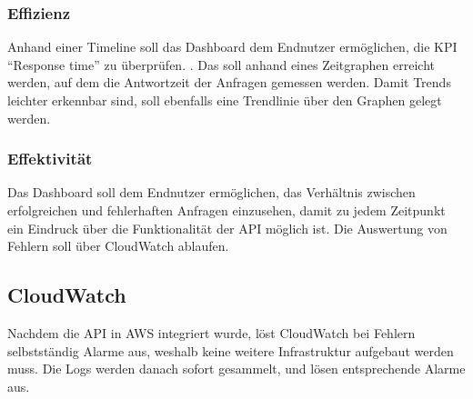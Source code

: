 \subsubsection{Effizienz}
Anhand einer Timeline soll das Dashboard dem Endnutzer ermöglichen, die KPI ``Response time'' zu überprüfen. \cite{DatadogAWS2024}. Das soll anhand eines Zeitgraphen erreicht werden, auf dem die Antwortzeit der Anfragen gemessen werden. Damit Trends leichter erkennbar sind, soll ebenfalls eine Trendlinie über den Graphen gelegt werden. 

\subsubsection{Effektivität}
Das Dashboard soll dem Endnutzer ermöglichen, das Verhältnis zwischen erfolgreichen und fehlerhaften Anfragen einzusehen, damit zu jedem Zeitpunkt ein Eindruck über die Funktionalität der API möglich ist.
\newline
Die Auswertung von Fehlern soll über CloudWatch ablaufen.
\subsection{CloudWatch}
Nachdem die API in AWS integriert wurde, löst CloudWatch bei Fehlern selbstständig Alarme aus, weshalb keine weitere Infrastruktur aufgebaut werden muss. Die Logs werden danach sofort gesammelt, und lösen entsprechende Alarme aus.

